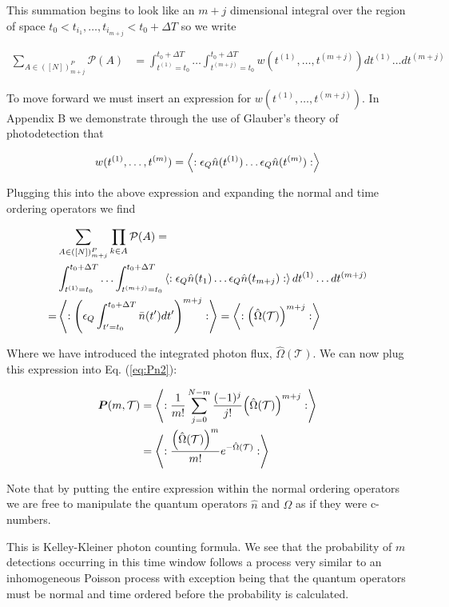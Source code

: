 \documentclass[12pt]{article}
\newcommand{\ep}{\epsilon}
\newcommand{\bv}[1]{\boldsymbol{#1}}
\begin{document}
This summation begins to look like an $m+j$ dimensional integral over the region of space $t_0 < t_{i_1}, \ldots, t_{i_{m+j}} < t_0 + \Delta T$ so we write

\begin{align}
\sum_{A \in ([N])_{m+j}^P} \mathcal{P}(A) &= \int_{t^{(1)} = t_0}^{t_0+\Delta T} \ldots \int_{t^{(m+j)} = t_0}^{t_0+\Delta T} w(t^{(1)}, \ldots, t^{(m+j)}) dt^{(1)}\ldots dt^{(m+j)}
\end{align}

To move forward we must insert an expression for $w(t^{(1)}, \ldots, t^{(m+j)})$. In Appendix B we demonstrate through the use of Glauber's theory of photodetection that

\begin{align}
w(t^{(1)},\ldots,t^{(m)}) = \Braket{:\ep_Q\hat{n}(t^{(1)}) \ldots \ep_Q \hat{n}(t^{(m)}) :}
\end{align}

Plugging this into the above expression and expanding the normal and time ordering operators we find

\begin{align}
&\sum_{A \in ([N])_{m+j}^P} \prod_{k \in A} \mathcal{P}(A) =\\ &\int_{t^{(1)} = t_0}^{t_0+\Delta T} \ldots \int_{t^{(m+j)} = t_0}^{t_0+\Delta T} \Braket{:\ep_Q \hat{n}(t_1) \ldots \ep_Q \hat{n}(t_{m+j}):} dt^{(1)}\ldots dt^{(m+j)}\\
= &\Braket{:\left(\ep_Q \int_{t'=t_0}^{t_0+\Delta T} \bar{n}(t') dt' \right)^{m+j}:} = \Braket{:\Big(\hat{\Omega}(\mathcal{T})\Big)^{m+j}:}
\end{align}

Where we have introduced the integrated photon flux, $\hat{\Omega}(\mathcal{T})$. We can now plug this expression into Eq. (\ref{eq:Pn2}):

\begin{align}
\bv{P}(m,\mathcal{T}) &= \Braket{:\frac{1}{m!} \sum_{j=0}^{N-m} \frac{(-1)^j}{j!} \Big(\hat{\Omega}(\mathcal{T})\Big)^{m+j}:}\\
&= \Braket{:\frac{\Big(\hat{\Omega}(\mathcal{T})\Big)^m}{m!} e^{-\hat{\Omega}(\mathcal{T})}:}
\end{align}

Note that by putting the entire expression within the normal ordering operators we are free to manipulate the quantum operators $\hat{n}$ and $\hat{\Omega}$ as if they were c-numbers. 

This is Kelley-Kleiner photon counting formula. We see that the probability of $m$ detections occurring in this time window follows a process very similar to an inhomogeneous Poisson process with exception being that the quantum operators must be normal and time ordered before the probability is calculated.
\end{document}
